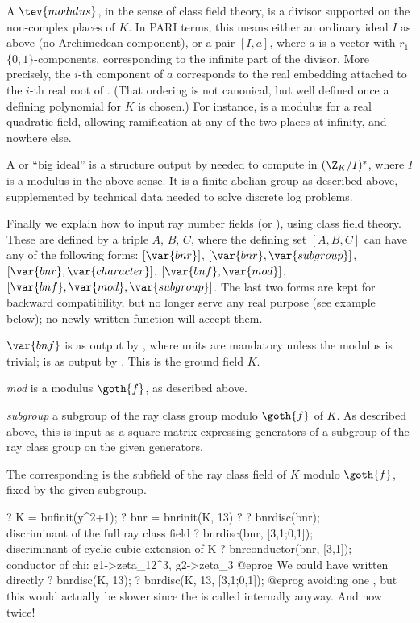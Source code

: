 \label{se:CFT}

A $\tev{modulus}$, in the sense of class field theory, is a divisor supported
on the non-complex places of $K$. In PARI terms, this means either an
ordinary ideal $I$ as above (no Archimedean component), or a pair $[I,a]$,
where $a$ is a vector with $r_1$ $\{0,1\}$-components, corresponding to the
infinite part of the divisor. More precisely, the $i$-th component of $a$
corresponds to the real embedding attached to the $i$-th real root of
. (That ordering is not canonical, but well defined once a
defining polynomial for $K$ is chosen.) For instance, \kbd{[1, [1,1]]} is a
modulus for a real quadratic field, allowing ramification at any of the two
places at infinity, and nowhere else.

A  or ``big ideal'' is a structure output by 
needed to compute in $(\Z_K/I)^*$, where $I$ is a modulus in the above sense.
It is a finite abelian group as described above, supplemented by
technical data needed to solve discrete log problems.

Finally we explain how to input ray number fields (or ), using class
field theory. These are defined by a triple $A$, $B$, $C$, where the
defining set $[A,B,C]$ can have any of the following forms:
$[\var{bnr}]$,
$[\var{bnr},\var{subgroup}]$,
$[\var{bnr},\var{character}]$,
$[\var{bnf},\var{mod}]$,
$[\var{bnf},\var{mod},\var{subgroup}]$. The last two forms are kept for
backward compatibility, but no longer serve any real purpose (see example
below); no newly written function will accept them.

\item $\var{bnf}$ is as output by , where units are mandatory
unless the modulus is trivial;  is as output by . This
is the ground field $K$.

\item \emph{mod} is a modulus $\goth{f}$, as described above.

\item \emph{subgroup} a subgroup of the ray class group modulo $\goth{f}$ of
$K$. As described above, this is input as a square matrix expressing
generators of a subgroup of the ray class group  on the
given generators.

The corresponding  is the subfield of the ray class field of $K$
modulo $\goth{f}$, fixed by the given subgroup.

\bprog
  ? K = bnfinit(y^2+1);
  ? bnr = bnrinit(K, 13)
  ? %
  ? bnrdisc(bnr); \\ discriminant of the full ray class field
  ? bnrdisc(bnr, [3,1;0,1]); \\ discriminant of cyclic cubic extension of K
  ? bnrconductor(bnr, [3,1]); \\ conductor of chi: g1->zeta_12^3, g2->zeta_3
@eprog\noindent
We could have written directly
\bprog
  ? bnrdisc(K, 13);
  ? bnrdisc(K, 13, [3,1;0,1]);
@eprog\noindent
avoiding one , but this would actually be slower since the
 is called internally anyway. And now twice!

